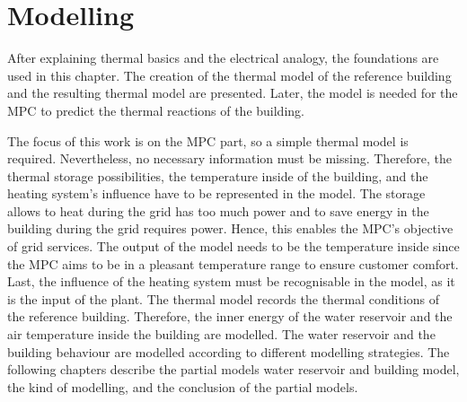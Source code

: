 \chapter{Modelling}
\label{ch:modelling}
After explaining thermal basics and the electrical analogy, the foundations are used in this chapter. The creation of the thermal model of the reference building and the resulting thermal model are presented. Later, the model is needed for the MPC to predict the thermal reactions of the building.
\newline
    
    The focus of this work is on the MPC part, so a simple thermal model is required. Nevertheless, no necessary information must be missing. Therefore, the thermal storage possibilities, the temperature inside of the building, and the heating system's influence have to be represented in the model. The storage allows to heat during the grid has too much power and to save energy in the building during the grid requires power. Hence, this enables the MPC's objective of grid services. The output of the model needs to be the temperature inside since the MPC aims to be in a pleasant temperature range to ensure customer comfort. Last, the influence of the heating system must be recognisable in the model, as it is the input of the plant.
    \newline
    The thermal model records the thermal conditions of the reference building. Therefore, the inner energy of the water reservoir and the air temperature inside the building are modelled. The water reservoir and the building behaviour are modelled according to different modelling strategies. The following chapters describe the partial models water reservoir and building model, the kind of modelling, and the conclusion of the partial models.
    
